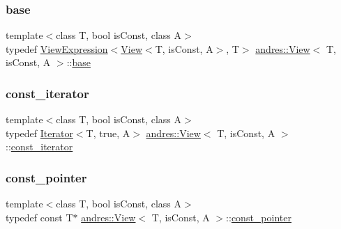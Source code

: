 \subsubsection{\texorpdfstring{base}{base}}
{\footnotesize\ttfamily template$<$class T, bool is\+Const, class A$>$ \\
typedef \hyperlink{classandres_1_1ViewExpression}{View\+Expression}$<$\hyperlink{classandres_1_1View}{View}$<$T, is\+Const, A$>$, T$>$ \hyperlink{classandres_1_1View}{andres\+::\+View}$<$ T, is\+Const, A $>$\+::\hyperlink{classandres_1_1View_ac9b2563b59f4fe1d90144bc4be2a2008}{base}}

\mbox{\label{classandres_1_1View_a7b6f125a7b3830f30cd34887b61858a7}} 
\subsubsection{\texorpdfstring{const\+\_\+iterator}{const\_iterator}}
{\footnotesize\ttfamily template$<$class T, bool is\+Const, class A$>$ \\
typedef \hyperlink{classandres_1_1Iterator}{Iterator}$<$T, true, A$>$ \hyperlink{classandres_1_1View}{andres\+::\+View}$<$ T, is\+Const, A $>$\+::\hyperlink{classandres_1_1View_a7b6f125a7b3830f30cd34887b61858a7}{const\+\_\+iterator}}

\mbox{\label{classandres_1_1View_a947d02064bced23437b804a8050e6ccb}} 
\subsubsection{\texorpdfstring{const\+\_\+pointer}{const\_pointer}}
{\footnotesize\ttfamily template$<$class T, bool is\+Const, class A$>$ \\
typedef const T$\ast$ \hyperlink{classandres_1_1View}{andres\+::\+View}$<$ T, is\+Const, A $>$\+::\hyperlink{classandres_1_1View_a947d02064bced23437b804a8050e6ccb}{const\+\_\+pointer}}

\mbox{\label{classandres_1_1View_a69e3d49e3d8242a33c03d42dd5ecc5b8}} 
